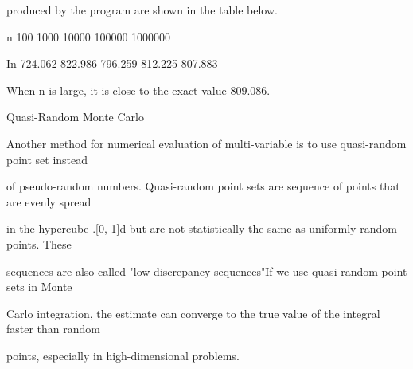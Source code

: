 produced by the program are shown in the table below.

n 100 1000 10000 100000 1000000

In 724.062 822.986 796.259 812.225 807.883

When n is large, it is close to the exact value 809.086.

Quasi-Random Monte Carlo

Another method for numerical evaluation of multi-variable is to use quasi-random point set instead

of pseudo-random numbers. Quasi-random point sets are sequence of points that are evenly spread

in the hypercube .[0, 1]d but are not statistically the same as uniformly random points. These

sequences are also called "low-discrepancy sequences"If we use quasi-random point sets in Monte

Carlo integration, the estimate can converge to the true value of the integral faster than random

points, especially in high-dimensional problems.

